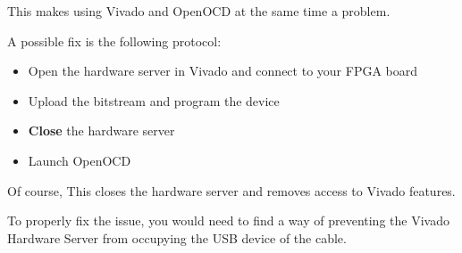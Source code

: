 \documentclass{article}
\begin{document}
	This makes using Vivado and OpenOCD at the same time a problem.
	
	A possible fix is the following protocol:
	
	\vspace{-\topsep}
	\begin{itemize}
	\item Open the hardware server in Vivado and connect to your FPGA board
	\item Upload the bitstream and program the device
	\item \textbf{Close} the hardware server
	\item Launch OpenOCD
	\end{itemize}
	
	Of course, This closes the hardware server and removes access to Vivado features.
	
	To properly fix the issue, you would need to find a way of preventing the Vivado Hardware Server from occupying the USB device of the cable.
	
\end{document}
